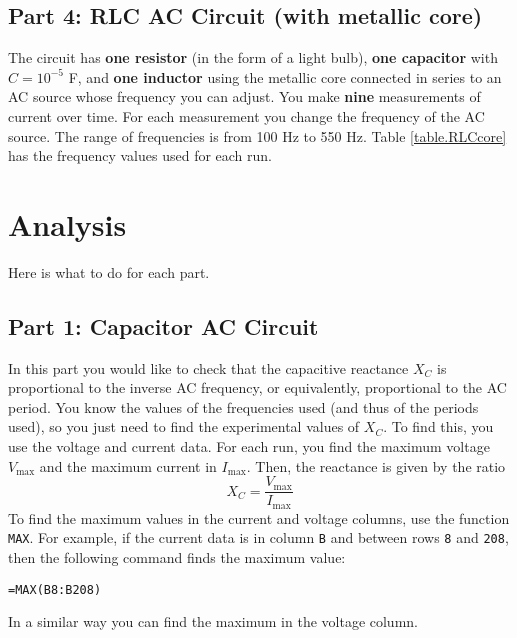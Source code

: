 \subsection{Part 4: RLC AC Circuit (with metallic core)}
The circuit has \textbf{one resistor} (in the form of a light bulb), \textbf{one capacitor} with $C = 10^{-5}$ F, and \textbf{one inductor} using the metallic core connected in series to an AC source whose frequency you can adjust. You make \textbf{nine} measurements of current over time. For each measurement you change the frequency of the AC source. The range of frequencies is from 100 Hz to 550 Hz. Table \ref{table.RLCcore} has the frequency values used for each run.
\section{Analysis}
Here is what to do for each part.
\subsection{Part 1: Capacitor AC Circuit}
In this part you would like to check that the capacitive reactance $X_{C}$ is proportional to the inverse AC frequency, or equivalently, proportional to the AC period. You know the values of the frequencies used (and thus of the periods used), so you just need to find the experimental values of $X_{C}$. To find this, you use the voltage and current data. For each run, you find the maximum voltage $V_{\text{max}}$ and the maximum current in $I_{\text{max}}$. Then, the reactance is given by the ratio
\begin{equation}
	X_{C} = \frac{V_{\text{max}}}{I_{\text{max}}}
\end{equation}
To find the maximum values in the current and voltage columns, use the function \texttt{MAX}. For example, if the current data is in column \texttt{B} and between rows \texttt{8} and \texttt{208}, then the following command finds the maximum value:
\begin{center}
	\texttt{=MAX(B8:B208)}
\end{center}
In a similar way you can find the maximum in the voltage column.

